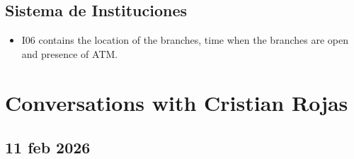 \documentclass[12pt]{article}
\theoremstyle{plain}
\theoremstyle{plain}
\theoremstyle{definition}  %
\theoremstyle{remark}  %
\begin{document}
\subsection{Sistema de Instituciones}
\begin{itemize}
    \item I06 contains the location of the branches, time when the branches are open and presence of ATM.
\end{itemize}




\section{Conversations with Cristian Rojas}

\subsection{11 feb 2026}
\end{document}
